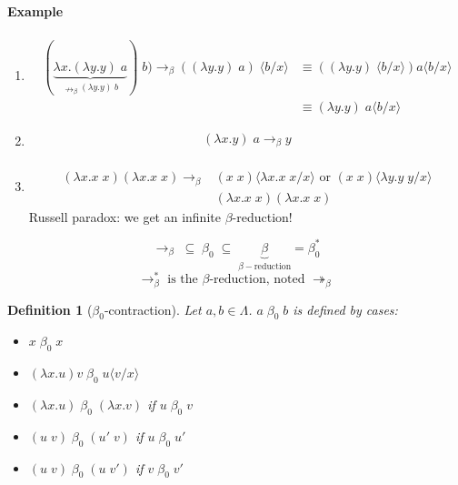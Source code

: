 \documentclass{article}
\newtheorem{defi}{Definition}
\newcommand\subst[2]{\langle #1\big/#2\rangle}
\begin{document}
\paragraph{Example}
\begin{enumerate}
\item \begin{align*}
(\underbrace{\lambda x. (\lambda y.y)\; a}_{\nrightarrow_\beta (\lambda y.y)\; b})\; b) \to_\beta ((\lambda y.y)\; a)\;\subst{b}{x} & \equiv ((\lambda y.y)\;\subst{b}{x})a\subst{b}{x}\\
& \equiv (\lambda y.y)\; a\subst{b}{x}
\end{align*}

\item \begin{align*}
(\lambda x.y)\; a \to_\beta y\\
\end{align*}

\item \begin{align*}
(\lambda x.x\; x)(\lambda x.x \;x) \to_\beta & (x\; x)\subst{\lambda x.x \; x}{x} \text{ or } (x\; x)\subst{\lambda y.y \; y}{x}\\
& (\lambda x. x\;x)(\lambda x.x\; x)
\end{align*}
Russell paradox: we get an infinite $\beta$-reduction!
\end{enumerate}

\[\to_\beta \; \subseteq \; \beta_0 \; \subseteq \; \underbrace{\beta}_{\beta-\text{reduction}} = \beta_0^* \]
\[\to_\beta^* \text{ is the $\beta$-reduction, noted } \twoheadrightarrow_\beta \]

\begin{defi}[$\beta_0$-contraction]
Let $a,b\in \Lambda$. $a\; \beta_0 \; b$ is defined by cases:
\begin{itemize}
\item $x\; \beta_0 \; x$
\item $(\lambda x.u)v\; \beta_0 \; u\subst{v}{x}$
\item $(\lambda x.u)\; \beta_0 \; (\lambda x.v)$ if $u\; \beta_0 \; v$
\item $(u\; v)\; \beta_0 \; (u'\; v)$ if $u\;\beta_0\;u'$
\item $(u\; v)\; \beta_0 \; (u\;v')$ if $v\; \beta_0 \; v'$
\end{itemize}
\end{defi}
\end{document}
